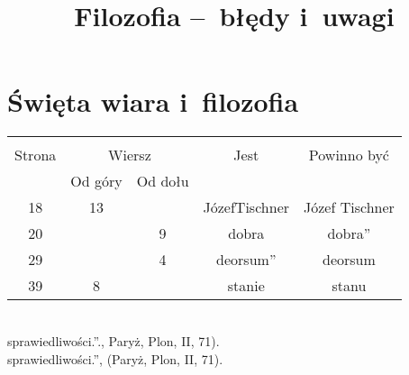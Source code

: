 \documentclass[a4paper,11pt]{article}
\title{Filozofia --~błędy i~uwagi}
\begin{document}



\maketitle  %



\section{Święta wiara i~filozofia}

\vspace{\spaceTwo}





\begin{center}
  \begin{tabular}{|c|c|c|c|c|}
    \hline
    & \multicolumn{2}{c|}{} & & \\
    Strona & \multicolumn{2}{c|}{Wiersz} & Jest
                              & Powinno być \\ \cline{2-3}
    & Od góry & Od dołu & & \\
    \hline
    18  & 13 & & JózefTischner & Józef Tischner \\
    20  & &  9 & dobra & dobra'' \\
    29  & &  4 & deorsum'' & deorsum \\
    39  &  8 & & stanie & stanu \\
    \hline
  \end{tabular}
\end{center}
\noi
{} \\
\Jest sprawiedliwości.''., Paryż, Plon, II, 71). \\
\Pow sprawiedliwości.'', (Paryż, Plon, II, 71). \\
\end{document}
